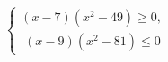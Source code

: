 \begin{ex}[type=ineq_system]
	\begin{condition}
		$\begin{cases} (x - 7)(x^2 - 49)\geqslant0,\\
			\;(x - 9)(x^2 - 81)\leqslant0
		\end{cases}$
	\end{condition}
\end{ex}